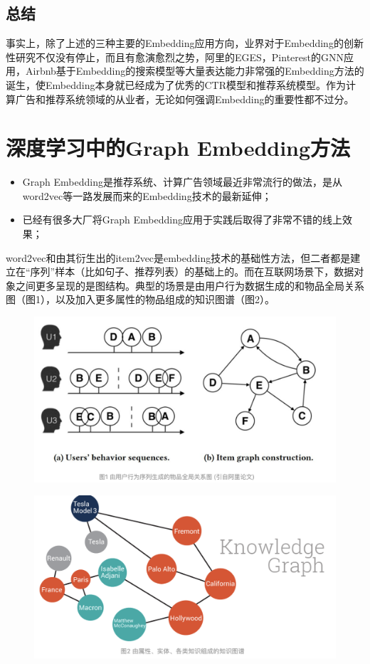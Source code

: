 \documentclass[12pt]{article}
\begin{document}
\subsection{总结}
事实上，除了上述的三种主要的Embedding应用方向，业界对于Embedding的创新性研究不仅没有停止，而且有愈演愈烈之势，阿里的EGES，Pinterest的GNN应用，Airbnb基于Embedding的搜索模型等大量表达能力非常强的Embedding方法的诞生，使Embedding本身就已经成为了优秀的CTR模型和推荐系统模型。作为计算广告和推荐系统领域的从业者，无论如何强调Embedding的重要性都不过分。

\section{深度学习中的Graph Embedding方法
\cite{Graph_Embedding_In_Deep_Learning}}
\begin{itemize}
\setlength{\itemsep}{0pt}
\setlength{\parsep}{0pt}
\setlength{\parskip}{0pt}
    \item Graph Embedding是推荐系统、计算广告领域最近非常流行的做法，是从word2vec等一路发展而来的Embedding技术的最新延伸；
    \item 已经有很多大厂将Graph Embedding应用于实践后取得了非常不错的线上效果；
\end{itemize}

word2vec和由其衍生出的item2vec是embedding技术的基础性方法，但二者都是建立在“序列”样本（比如句子、推荐列表）的基础上的。而在互联网场景下，数据对象之间更多呈现的是图结构。典型的场景是由用户行为数据生成的和物品全局关系图（图1），以及加入更多属性的物品组成的知识图谱（图2）。
\begin{figure}[H]
    \centering
    \includegraphics[width=.6\textwidth]{fig/Graph_Embedding_User_Activity_Graph.png}
\end{figure}

\begin{figure}[H]
    \centering
    \includegraphics[width=.6\textwidth]{fig/Graph_Embedding_Knowledge_Graph.png}
\end{figure}
\end{document}
